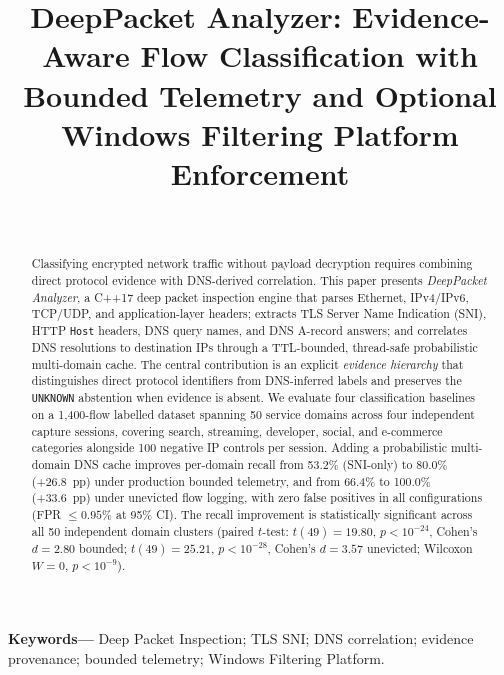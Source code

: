 \documentclass[conference]{IEEEtran}
\begin{document}
\title{DeepPacket Analyzer: Evidence-Aware Flow Classification with\\
Bounded Telemetry and Optional Windows Filtering Platform Enforcement}

\author{
\\
}

\maketitle

\begin{abstract}
Classifying encrypted network traffic without payload decryption requires
combining direct protocol evidence with DNS-derived correlation.
This paper presents \textit{DeepPacket Analyzer}, a C++17 deep packet
inspection engine that parses Ethernet, IPv4/IPv6, TCP/UDP, and
application-layer headers; extracts TLS Server Name Indication (SNI),
HTTP \texttt{Host} headers, DNS query names, and DNS A-record answers;
and correlates DNS resolutions to destination IPs through a
TTL-bounded, thread-safe probabilistic multi-domain cache.
The central contribution is an explicit \textit{evidence hierarchy}
that distinguishes direct protocol identifiers from DNS-inferred
labels and preserves the \texttt{UNKNOWN} abstention
when evidence is absent.
We evaluate four classification baselines on a 1,400-flow labelled
dataset spanning 50 service domains across four independent capture
sessions, covering search, streaming, developer, social, and e-commerce
categories alongside 100 negative IP controls per session.
Adding a probabilistic multi-domain DNS cache improves per-domain recall
from 53.2\% (SNI-only) to 80.0\% (+26.8~pp) under production bounded
telemetry, and from 66.4\% to 100.0\% (+33.6~pp) under unevicted flow logging,
with zero false positives in all configurations (FPR $\le 0.95\%$ at 95\% CI).
The recall improvement is statistically significant across all 50
independent domain clusters (paired $t$-test: $t(49) = 19.80$,
$p < 10^{-24}$, Cohen's $d = 2.80$ bounded; $t(49) = 25.21$,
$p < 10^{-28}$, Cohen's $d = 3.57$ unevicted; Wilcoxon $W = 0$, $p < 10^{-9}$).
\end{abstract}

\textbf{Keywords---}
Deep Packet Inspection; TLS SNI; DNS correlation; evidence provenance;
bounded telemetry; Windows Filtering Platform.
\end{document}
